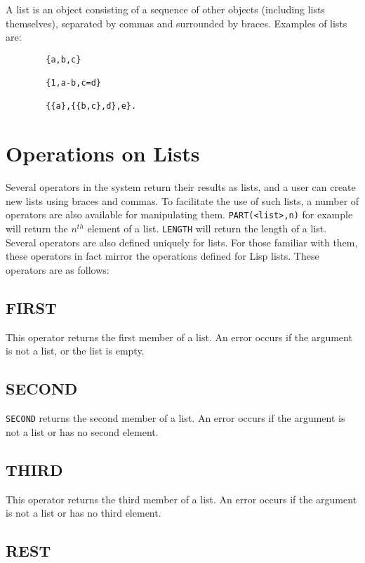 A list is an object consisting of a sequence of other objects
(including lists themselves), separated by commas and surrounded by
braces.  Examples of lists are:
\begin{verbatim}
        {a,b,c}

        {1,a-b,c=d}

        {{a},{{b,c},d},e}.
\end{verbatim}

\section{Operations on Lists}

Several operators in the system return their results as lists, and a user
can create new lists using braces and commas.  To facilitate the use of
such lists, a number of operators are also available for manipulating
them. {\tt PART(<list>,n)} for example will return the
$n^{th}$ element of a list. {\tt LENGTH} will return the
length of a list.  Several operators are also defined uniquely for lists.
For those familiar with them, these operators in fact mirror the
operations defined for Lisp lists.  These operators are as follows:

\subsection{FIRST}

This operator returns the first member of a list.  An error
occurs if the argument is not a list, or the list is empty.

\subsection{SECOND}

{\tt SECOND}  returns the second member of a list.  An error
occurs if the argument is not a list or has no second element.

\subsection{THIRD}

This operator returns the third member of a list.  An error
occurs if the argument is not a list or has no third element.

\subsection{REST}

